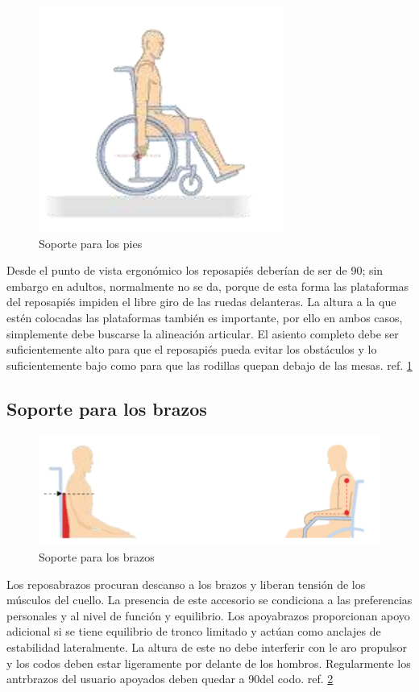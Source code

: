 \begin{figure}[th]
    \centering
    \includegraphics[width=.3\textwidth]{Figures/reposapies.png}
    \decoRule
    \caption{Soporte para los pies}
    \label{fig:posapies}
\end{figure}

Desde el punto de vista ergon\'omico los reposapi\'es
deber\'ian de ser de 90\textdegree; sin embargo en adultos, normalmente no se da, porque
de esta forma las plataformas del reposapi\'es impiden el libre giro de las ruedas
delanteras. La altura a la que est\'en colocadas las plataformas tambi\'en es
importante, por ello en ambos casos, simplemente debe buscarse la alineaci\'on
articular. El asiento completo debe ser suficientemente alto para que el
reposapi\'es pueda evitar los obst\'aculos y lo suficientemente bajo como para
que las rodillas quepan debajo de las mesas. ref. \ref{fig:posapies}

\subsection{Soporte para los brazos}

\begin{figure}[th]
    \centering
    \includegraphics[width=.8\textwidth]{Figures/apoyabrazos.png}
    \decoRule
    \caption{Soporte para los brazos}
    \label{fig:apoyabrazos}
\end{figure}
Los reposabrazos procuran descanso a los brazos y liberan tensi\'on de los
m\'usculos del cuello. La presencia de este accesorio se condiciona a las
preferencias personales y al nivel de funci\'on y equilibrio. Los apoyabrazos
proporcionan apoyo adicional si se tiene equilibrio de tronco limitado y
act\'uan como anclajes de estabilidad lateralmente. La altura de este no debe
interferir con le aro propulsor y los codos deben estar ligeramente por delante
de los hombros. Regularmente los antrbrazos del usuario apoyados deben quedar a
90\textdegree del codo. ref. \ref{fig:apoyabrazos}


